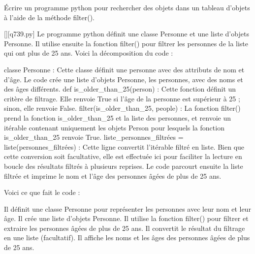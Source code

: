         \question
        Écrire un programme python pour rechercher des objets dans un tableau d'objets à l'aide de la méthode filter().
        \par
        \begin{solution}
            \renewcommand{\nomfichier}{q739.py}
            \pythonfile{\chemincode \nomfichier}[][\nomfichier]
            Le programme python définit une classe Personne et une liste d'objets Personne. Il utilise ensuite la fonction filter() pour filtrer les personnes de la liste qui ont plus de 25 ans. Voici la décomposition du code :

    classe Personne : Cette classe définit une personne avec des attributs de nom et d'âge.
    Le code crée une liste d'objets Personne, les personnes, avec des noms et des âges différents.
    def is_older_than_25(person) : Cette fonction définit un critère de filtrage. Elle renvoie True si l'âge de la personne est supérieur à 25 ; sinon, elle renvoie False.
    filter(is_older_than_25, people) : La fonction filter() prend la fonction is_older_than_25 et la liste des personnes, et renvoie un itérable contenant uniquement les objets Person pour lesquels la fonction is_older_than_25 renvoie True.
    liste_personnes_filtrées = liste(personnes_filtrées) : Cette ligne convertit l'itérable filtré en liste. Bien que cette conversion soit facultative, elle est effectuée ici pour faciliter la lecture en boucle des résultats filtrés à plusieurs reprises.
    Le code parcourt ensuite la liste filtrée et imprime le nom et l'âge des personnes âgées de plus de 25 ans.

Voici ce que fait le code :

    Il définit une classe Personne pour représenter les personnes avec leur nom et leur âge.
    Il crée une liste d'objets Personne.
    Il utilise la fonction filter() pour filtrer et extraire les personnes âgées de plus de 25 ans.
    Il convertit le résultat du filtrage en une liste (facultatif).
    Il affiche les noms et les âges des personnes âgées de plus de 25 ans.
        \end{solution}
        

